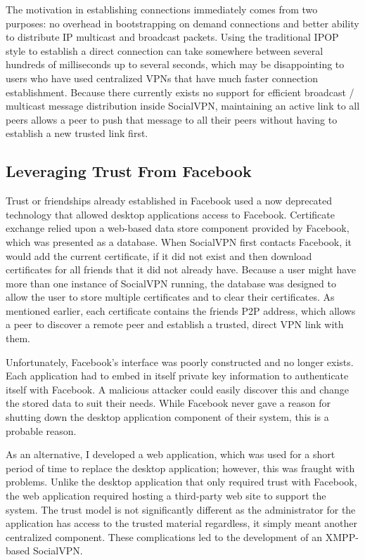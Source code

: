 The motivation in establishing connections immediately comes from two purposes:
no overhead in bootstrapping on demand connections and better ability to
distribute IP multicast and broadcast packets.  Using the traditional IPOP
style to establish a direct connection can take somewhere between several
hundreds of milliseconds up to several seconds, which may be disappointing to
users who have used centralized VPNs that have much faster connection
establishment.  Because there currently exists no support for efficient
broadcast / multicast message distribution inside SocialVPN, maintaining an
active link to all peers allows a peer to push that message to all their peers
without having to establish a new trusted link first.

\subsection{Leveraging Trust From Facebook}

Trust or friendships already established in Facebook used a now deprecated
technology that allowed desktop applications access to Facebook.  Certificate
exchange relied upon a web-based data store component provided by Facebook,
which was presented as a database.  When SocialVPN first contacts Facebook, it
would add the current certificate, if it did not exist and then download
certificates for all friends that it did not already have.  Because a user
might have more than one instance of SocialVPN running, the database was
designed to allow the user to store multiple certificates and to clear their
certificates.  As mentioned earlier, each certificate contains the friends P2P
address, which allows a peer to discover a remote peer and establish a trusted,
direct VPN link with them.

Unfortunately, Facebook's interface was poorly constructed and no longer
exists.  Each application had to embed in itself private key information to
authenticate itself with Facebook.  A malicious attacker could easily discover
this and change the stored data to suit their needs.  While Facebook never gave
a reason for shutting down the desktop application component of their system,
this is a probable reason.

As an alternative, I developed a web application, which was used for a short
period of time to replace the desktop application; however, this was fraught
with problems.  Unlike the desktop application that only required trust with
Facebook, the web application required hosting a third-party web site to
support the system.  The trust model is not significantly different as the
administrator for the application has access to the trusted material
regardless, it simply meant another centralized component.  These complications
led to the development of an XMPP-based SocialVPN.

